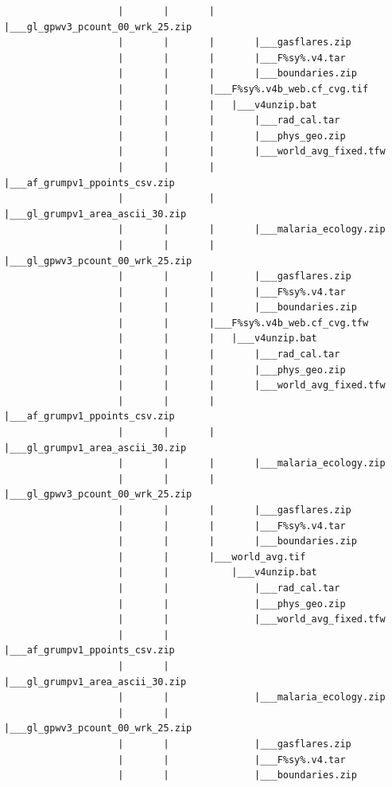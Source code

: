 \documentclass[]{book}
\begin{document}
\begin{verbatim}
                    |       |       |       |___gl_gpwv3_pcount_00_wrk_25.zip
                    |       |       |       |___gasflares.zip
                    |       |       |       |___F%sy%.v4.tar
                    |       |       |       |___boundaries.zip
                    |       |       |___F%sy%.v4b_web.cf_cvg.tif
                    |       |       |   |___v4unzip.bat
                    |       |       |       |___rad_cal.tar
                    |       |       |       |___phys_geo.zip
                    |       |       |       |___world_avg_fixed.tfw
                    |       |       |       |___af_grumpv1_ppoints_csv.zip
                    |       |       |       |___gl_grumpv1_area_ascii_30.zip
                    |       |       |       |___malaria_ecology.zip
                    |       |       |       |___gl_gpwv3_pcount_00_wrk_25.zip
                    |       |       |       |___gasflares.zip
                    |       |       |       |___F%sy%.v4.tar
                    |       |       |       |___boundaries.zip
                    |       |       |___F%sy%.v4b_web.cf_cvg.tfw
                    |       |       |   |___v4unzip.bat
                    |       |       |       |___rad_cal.tar
                    |       |       |       |___phys_geo.zip
                    |       |       |       |___world_avg_fixed.tfw
                    |       |       |       |___af_grumpv1_ppoints_csv.zip
                    |       |       |       |___gl_grumpv1_area_ascii_30.zip
                    |       |       |       |___malaria_ecology.zip
                    |       |       |       |___gl_gpwv3_pcount_00_wrk_25.zip
                    |       |       |       |___gasflares.zip
                    |       |       |       |___F%sy%.v4.tar
                    |       |       |       |___boundaries.zip
                    |       |       |___world_avg.tif
                    |       |           |___v4unzip.bat
                    |       |               |___rad_cal.tar
                    |       |               |___phys_geo.zip
                    |       |               |___world_avg_fixed.tfw
                    |       |               |___af_grumpv1_ppoints_csv.zip
                    |       |               |___gl_grumpv1_area_ascii_30.zip
                    |       |               |___malaria_ecology.zip
                    |       |               |___gl_gpwv3_pcount_00_wrk_25.zip
                    |       |               |___gasflares.zip
                    |       |               |___F%sy%.v4.tar
                    |       |               |___boundaries.zip

\end{verbatim}
\end{document}
